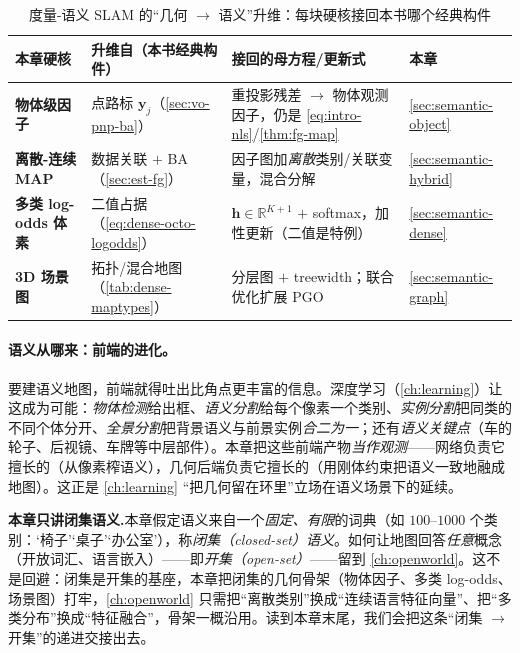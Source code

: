 \begin{table}[H]\centering\small
\caption{度量-语义 SLAM 的“几何 $\to$ 语义”升维：每块硬核接回本书哪个经典构件}
\label{tab:semantic-lift}
\begin{tabular}{p{} p{} p{} p{}}
\toprule
本章硬核 & 升维自（本书经典构件） & 接回的母方程/更新式 & 本章 \\
\midrule
\textbf{物体级因子} & 点路标 $\mathbf{y}_j$（\cref{sec:vo-pnp-ba}） & 重投影残差 $\to$ 物体观测因子，仍是 \cref{eq:intro-nls}/\cref{thm:fg-map} & \cref{sec:semantic-object} \\
\textbf{离散-连续 MAP} & 数据关联 $+$ BA（\cref{sec:est-fg}） & 因子图加\emph{离散}类别/关联变量，混合分解 & \cref{sec:semantic-hybrid} \\
\textbf{多类 log-odds 体素} & 二值占据（\cref{eq:dense-octo-logodds}） & $\mathbf{h}\in\mathbb{R}^{K+1}$ $+$ softmax，加性更新（二值是特例） & \cref{sec:semantic-dense} \\
\textbf{3D 场景图} & 拓扑/混合地图（\cref{tab:dense-maptypes}） & 分层图 $+$ treewidth；联合优化扩展 PGO & \cref{sec:semantic-graph} \\
\bottomrule
\end{tabular}
\end{table}

\paragraph{语义从哪来：前端的进化。}
要建语义地图，前端就得吐出比角点更丰富的信息\cite{carlone2026handbook}。深度学习（\cref{ch:learning}）让这成为可能：\emph{物体检测}给出框、\emph{语义分割}给每个像素一个类别\cite{long2015fcn}、\emph{实例分割}把同类的不同个体分开\cite{he2017maskrcnn}、\emph{全景分割}把背景语义与前景实例\emph{合二为一}\cite{kirillov2019panoptic}；还有\emph{语义关键点}\cite{pavlakos2017semantickeypoints}（车的轮子、后视镜、车牌等中层部件）。本章把这些前端产物\emph{当作观测}——网络负责它擅长的（从像素榨语义），几何后端负责它擅长的（用刚体约束把语义一致地融成地图）。这正是 \cref{ch:learning} “把几何留在环里”立场在语义场景下的延续。

\begin{note}
\textbf{本章只讲闭集语义.}\;本章假定语义来自一个\emph{固定、有限}的词典（如 $100$–$1000$ 个类别：‘椅子’‘桌子’‘办公室’），称\emph{闭集（closed-set）语义}\cite{carlone2026handbook}。如何让地图回答\emph{任意}概念（开放词汇、语言嵌入）——即\emph{开集（open-set）}——留到 \cref{ch:openworld}。这不是回避：闭集是开集的基座，本章把闭集的几何骨架（物体因子、多类 log-odds、场景图）打牢，\cref{ch:openworld} 只需把“离散类别”换成“连续语言特征向量”、把“多类分布”换成“特征融合”，骨架一概沿用。读到本章末尾，我们会把这条“闭集 $\to$ 开集”的递进交接出去。
\end{note}

